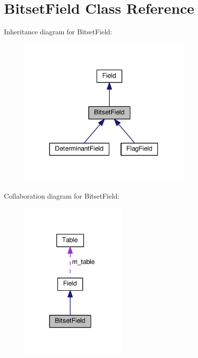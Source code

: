 \hypertarget{classBitsetField}{}\section{Bitset\+Field Class Reference}
\label{classBitsetField}


Inheritance diagram for Bitset\+Field\+:\nopagebreak
\begin{figure}[H]
\begin{center}
\leavevmode
\includegraphics[width=246pt]{classBitsetField__inherit__graph}
\end{center}
\end{figure}


Collaboration diagram for Bitset\+Field\+:\nopagebreak
\begin{figure}[H]
\begin{center}
\leavevmode
\includegraphics[width=150pt]{classBitsetField__coll__graph}
\end{center}
\end{figure}
